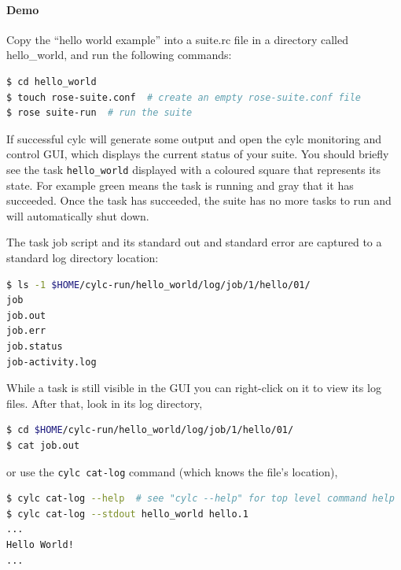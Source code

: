 \paragraph*{Demo}
Copy the ``hello world example'' into a suite.rc file in a directory called
hello\_world, and run the following commands:

\begin{lstlisting}[language=bash]
$ cd hello_world
$ touch rose-suite.conf  # create an empty rose-suite.conf file
$ rose suite-run  # run the suite
\end{lstlisting}

If successful cylc will generate some output and open the cylc monitoring and
control GUI, which displays the current status of your suite. You should
briefly see the task \lstinline{hello_world} displayed with a coloured square
that represents its state. For example green means the task is running and gray
that it has succeeded.  Once the task has succeeded, the suite has no more
tasks to run and will automatically shut down.

The task job script and its standard out and standard error are captured to
a standard log directory location:
\begin{lstlisting}[language=bash]
$ ls -1 $HOME/cylc-run/hello_world/log/job/1/hello/01/
job
job.out
job.err
job.status
job-activity.log
\end{lstlisting}


While a task is still visible in the GUI you can right-click on it to view its
log files.  After that, look in its log directory,

\begin{lstlisting}[language=bash]
$ cd $HOME/cylc-run/hello_world/log/job/1/hello/01/
$ cat job.out
\end{lstlisting}

or use the \lstinline{cylc cat-log} command (which knows the file's location),

\begin{lstlisting}[language=bash]
$ cylc cat-log --help  # see "cylc --help" for top level command help
$ cylc cat-log --stdout hello_world hello.1
...
Hello World!
...
\end{lstlisting}

